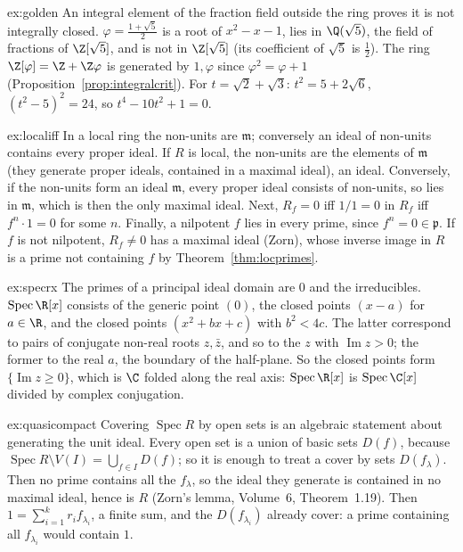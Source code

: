\begin{solution}{ex:golden}
\idea An integral element of the fraction field outside the ring proves it is not integrally closed.
\writeup $\varphi=\frac{1+\sqrt5}2$ is a root of $x^2-x-1$, lies in $\Q(\sqrt5)$, the field of fractions of $\Z[\sqrt5]$, and is not in $\Z[\sqrt5]$ (its coefficient of $\sqrt5$ is $\frac12$). The ring $\Z[\varphi]=\Z+\Z\varphi$ is
generated by $1,\varphi$ since $\varphi^2=\varphi+1$ (Proposition~\ref{prop:integralcrit}). For $t=\sqrt2+\sqrt3$: $t^2=5+2\sqrt6$, $(t^2-5)^2=24$, so $t^4-10t^2+1=0$.
\end{solution}

\begin{solution}{ex:localiff}
\idea In a local ring the non-units are $\mathfrak m$; conversely an ideal of non-units contains every proper ideal.
\writeup If $R$ is local, the non-units are the elements of $\mathfrak m$ (they generate proper ideals, contained in a maximal ideal), an ideal. Conversely, if the non-units form an ideal $\mathfrak m$, every proper ideal consists of non-units, so lies in
$\mathfrak m$, which is then the only maximal ideal. Next, $R_f=0$ iff $1/1=0$ in $R_f$ iff $f^n\cdot1=0$ for some $n$. Finally, a nilpotent $f$ lies in every prime, since $f^n=0\in\mathfrak p$. If $f$ is not nilpotent, $R_f\ne0$ has a maximal
ideal (Zorn), whose inverse image in $R$ is a prime not containing $f$ by Theorem~\ref{thm:locprimes}.
\end{solution}

\begin{solution}{ex:specrx}
\idea The primes of a principal ideal domain are $0$ and the irreducibles.
\writeup $\operatorname{Spec}\R[x]$ consists of the generic point $(0)$, the closed points $(x-a)$ for $a\in\R$, and the closed points $(x^2+bx+c)$ with $b^2<4c$. The latter correspond to pairs of conjugate non-real roots $z,\bar z$, and so
to the $z$ with $\operatorname{Im}z>0$; the former to the real $a$, the boundary of the half-plane. So the closed points form $\{\operatorname{Im}z\ge0\}$, which is $\C$ folded along the real axis: $\operatorname{Spec}\R[x]$ is
$\operatorname{Spec}\C[x]$ divided by complex conjugation.
\end{solution}

\begin{solution}{ex:quasicompact}
\idea Covering $\operatorname{Spec}R$ by open sets is an algebraic statement about generating the unit ideal.
\writeup Every open set is a union of basic sets $D(f)$, because $\operatorname{Spec}R\setminus V(I)=\bigcup_{f\in I}D(f)$; so it is enough to treat a cover by sets $D(f_\lambda)$. Then no prime contains all the $f_\lambda$, so the ideal they
generate is contained in no maximal ideal, hence is $R$ (Zorn's lemma, Volume~6, Theorem~1.19). Then $1=\sum_{i=1}^kr_if_{\lambda_i}$, a finite sum, and the $D(f_{\lambda_i})$ already cover: a prime containing all $f_{\lambda_i}$ would contain $1$.
\end{solution}

